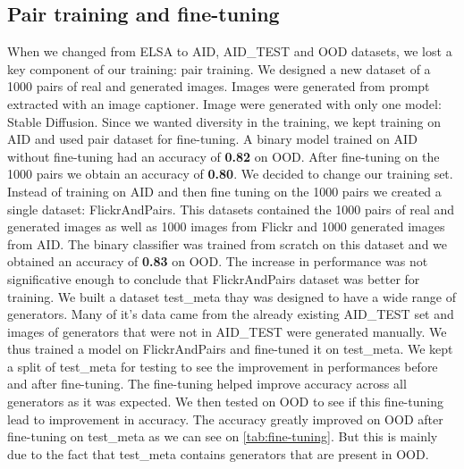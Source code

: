 \documentclass[12pt,a4paper]{article}
\begin{document}
\subsection{Pair training and fine-tuning}
When we changed from ELSA to AID, AID\_TEST and OOD datasets, we lost a key component of our training: pair training. We designed a new dataset of a 1000 pairs of real and generated images. Images were generated from prompt extracted with an image captioner. Image were generated with only one model: Stable Diffusion. Since we wanted diversity in the training, we kept training on AID and used pair dataset for fine-tuning. A binary model trained on AID without fine-tuning had an accuracy of \textbf{0.82} on OOD. After fine-tuning on the 1000 pairs we obtain an accuracy of \textbf{0.80}. We decided to change our training set. Instead of training on AID and then fine tuning on the 1000 pairs we created a single dataset: FlickrAndPairs. This datasets contained the 1000 pairs of real and generated images as well as 1000 images from Flickr and 1000 generated images from AID. The binary classifier was trained from scratch on this dataset and we obtained an accuracy of \textbf{0.83} on OOD. The increase in performance was not significative enough to conclude that FlickrAndPairs dataset was better for training. We built a dataset test\_meta thay was designed to have a wide range of generators. Many of it's data came from the already existing AID\_TEST set and images of generators that were not in AID\_TEST were generated manually. We thus trained a model on FlickrAndPairs and fine-tuned it on test\_meta. We kept a split of test\_meta for testing to see the improvement in performances before and after fine-tuning. The fine-tuning helped improve accuracy across all generators as it was expected. We then tested on OOD to see if this fine-tuning lead to improvement in accuracy. The accuracy greatly improved on OOD after fine-tuning on test\_meta as we can see on \autoref{tab:fine-tuning}. But this is mainly due to the fact that test\_meta contains generators that are present in OOD.
\end{document}
